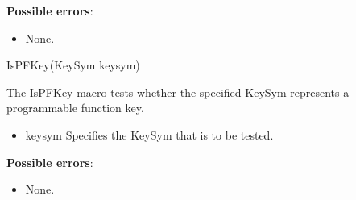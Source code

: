 \documentclass{report}
\begin{document}
\begin{itemize}
        \textbf{Possible errors}:
        \begin{itemize}
            \item None.
        \end{itemize}

        \begin{cppcode}
        IsPFKey(KeySym keysym)
        \end{cppcode}
        \bigbreak \noindent
        The IsPFKey macro tests whether the specified KeySym represents a programmable function key.
        \begin{itemize}
            \item keysym Specifies the KeySym that is to be tested.
        \end{itemize}

        \textbf{Possible errors}:
        \begin{itemize}
            \item None.
        \end{itemize}

    \end{itemize}
\end{document}
